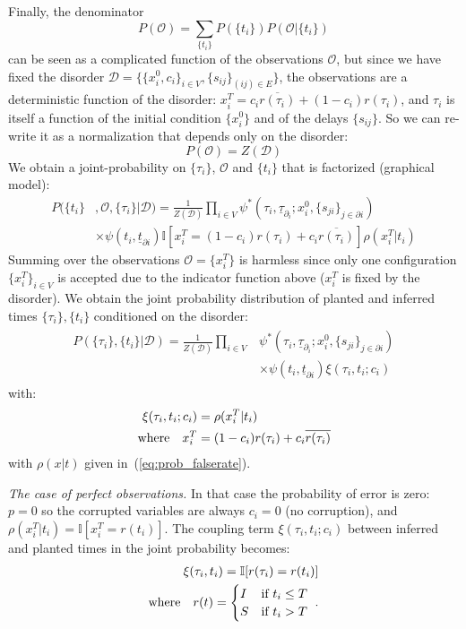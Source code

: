 \documentclass[a4paper, amsfonts, amssymb, amsmath, reprint, showkeys, nofootinbib, twoside, floatfix, pre,superscriptaddress]{revtex4-2}
\begin{document}
Finally, the denominator $$P(\mathcal{O})=\sum_{\{t_i\}}P(\{t_i\})P(\mathcal{O}|\{t_i\})$$ can be seen as a complicated function of the observations $\mathcal{O}$, but since we have fixed the disorder $\mathcal{D}=\{\{x_i^0, c_i\}_{i\in V}, \{s_{ij}\}_{(ij)\in E}\}$, the observations are a deterministic function of the disorder:
$x_i^T=c_i\overline{r(\tau_i)}+(1-c_i)r(\tau_i)$, and $\tau_i$ is itself a function of the initial condition $\{x_i^0\}$ and of the delays $\{s_{ij}\}$. So we can re-write it as a normalization that depends only on the disorder:
$$
	P(\mathcal{O})=Z(\mathcal{D})
$$
We obtain a joint-probability on $\{\tau_i\}$, $\mathcal{O}$ and $\{t_i\}$ that is factorized (graphical model):
\begin{align*}
	P(\{t_i\}&,\mathcal{O},\{\tau_i\}|\mathcal{D}) = \frac{1}{Z(\mathcal{D})}\prod_{i\in V}\psi^*(\tau_i, \underline{\tau}_{\partial_i};x_i^0,\{s_{ji}\}_{j\in\partial i}) \\
	&\times \psi(t_i,\underline{t}_{\partial i})\mathbb{I}[x_i^T=(1-c_i)r(\tau_i)+c_i\overline{r(\tau_i)}] \rho(x_i^T|t_i)
\end{align*}
Summing over the observations $\mathcal{O}=\{x_i^T\}$ is harmless since only one configuration $\{x_i^T\}_{i\in V}$ is accepted due to the indicator function above ($x_i^T$ is fixed by the disorder).
We obtain the joint probability distribution of planted and inferred times $\{\tau_i\}, \{t_i\}$ conditioned on the disorder:
\begin{align}
\label{eq:joint_disorder}
\begin{aligned}
	P(\{\tau_i\}, \{t_i\}|\mathcal{D})=\frac{1}{Z(\mathcal{D})}\prod_{i\in V}&\psi^*(\tau_i, \underline{\tau}_{\partial_i};x_i^0,\{s_{ji}\}_{j\in\partial i}) \\
&\times \psi(t_i,\underline{t}_{\partial i})\xi(\tau_i, t_i;c_i)
\end{aligned}
\end{align}
with:
\begin{align}
\begin{aligned}
	\xi(\tau_i, t_i;c_i) &= \rho(x_i^T|t_i) \\
	{\rm where} \quad x_i^T&=(1-c_i)r(\tau_i)+c_i\overline{r(\tau_i)}
\end{aligned}
\end{align}
with $\rho(x|t)$ given in~(\ref{eq:prob_falserate}).

{\it The case of perfect observations.}
In that case the probability of error is zero: $p=0$ so the corrupted variables are always $c_i=0$ (no corruption), and $\rho(x_i^T|t_i)=\mathbb{I}[x_i^T=r(t_i)]$. The coupling term $\xi(\tau_i, t_i;c_i)$ between inferred and planted times in the joint probability becomes:
\begin{align*}
	\xi(\tau_i, t_i)=\mathbb{I}[r(\tau_i)=r(t_i)] \\
	{\rm where} \quad r(t)=\begin{cases}
	I & \text{if $t_i\leq T$}\\
	S & \text{if $t_i>T$}
	\end{cases} \ .
\end{align*}
\end{document}
